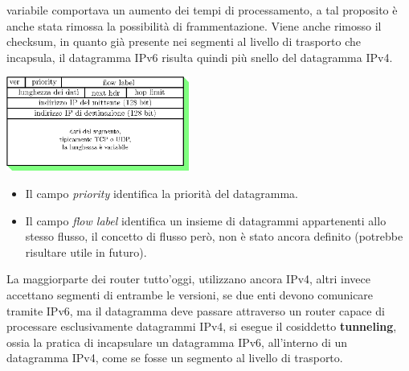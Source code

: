 \documentclass[12pt, letterpaper]{article}
\begin{document}
variabile comportava un aumento dei tempi di processamento, a tal proposito è anche stata rimossa la possibilità 
di frammentazione. Viene anche rimosso il checksum, in quanto già presente nei segmenti al livello di trasporto che 
incapsula, il datagramma IPv6 risulta quindi più snello del datagramma IPv4.\begin{center}
    \includegraphics[width=0.45\textwidth ]{images/IPv6Datagram.eps}
\end{center}
\begin{itemize}
    \item Il campo \textit{priority} identifica la priorità del datagramma.
    \item Il campo \textit{flow label} identifica un insieme di datagrammi appartenenti allo stesso flusso, il concetto 
    di flusso però, non è stato ancora definito (potrebbe risultare utile in futuro).
\end{itemize}
La maggiorparte dei router tutto'oggi, utilizzano ancora IPv4, altri invece accettano segmenti di entrambe le 
versioni, se due enti devono comunicare tramite IPv6, ma il datagramma deve passare attraverso un router capace di 
processare esclusivamente datagrammi IPv4, si esegue il cosiddetto \textbf{tunneling}, ossia la pratica di incapsulare un 
datagramma IPv6, all'interno di un datagramma IPv4, come se fosse un segmento al livello di trasporto.
\end{document}
